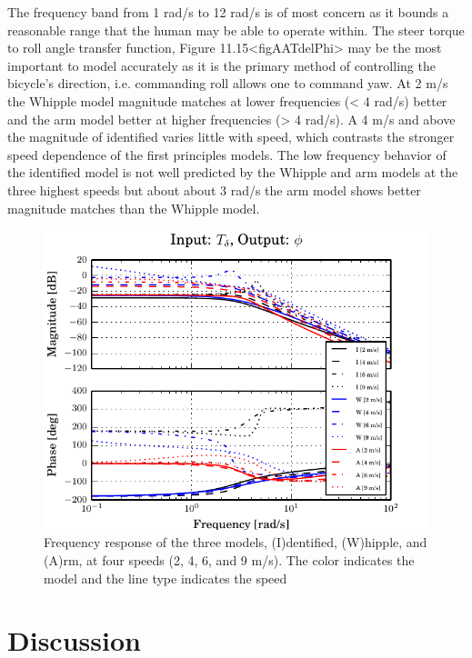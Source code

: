 \documentclass[a4paper]{article}
\begin{document}
The frequency band from 1 rad/s to 12 rad/s is of most concern as it bounds a
reasonable range that the human may be able to operate within. The steer torque
to roll angle transfer function, Figure
11.15\textless{}figAATdelPhi\textgreater{} may be the most important to model
accurately as it is the primary method of controlling the bicycle's direction,
i.e. commanding roll allows one to command yaw. At 2 m/s the Whipple model
magnitude matches at lower frequencies (\textless{} 4 rad/s) better and the arm
model better at higher frequencies (\textgreater{} 4 rad/s). A 4 m/s and above
the magnitude of identified varies little with speed, which contrasts the
stronger speed dependence of the first principles models. The low frequency
behavior of the identified model is not well predicted by the Whipple and arm
models at the three highest speeds but about about 3 rad/s the arm model shows
better magnitude matches than the Whipple model.

\begin{figure}
  \includegraphics[width=5in]{figures/L-P-Tdel-Phi.pdf}
  \caption{Frequency response of the three models, (I)dentified, (W)hipple, and
    (A)rm, at four speeds (2, 4, 6, and 9 m/s). The color indicates the model
    and the line type indicates the speed}
\end{figure}

\begin{table}
  
\end{table}

\section{Discussion}
\end{document}

